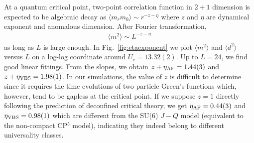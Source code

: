 \documentclass[twocolumn,superscriptaddress]{revtex4-1}
\begin{document}
At a quantum critical point, two-point correlation function in $2+1$ dimension is expected to be algebraic decay as $\langle m_rm_0\rangle\sim r^{-z-\eta}$ where $z$ and $\eta$ are dynamical exponent and anomalous dimension. \cite{Sondhi1997} After Fourier transformation, \begin{eqnarray} \langle m^2 \rangle \sim L^{-z-\eta} \end{eqnarray}
as long as $L$ is large enough. In Fig.~\ref{fig:etaexponent} we plot $\langle m^2 \rangle$ and $\langle d^2\rangle$ versus $L$ on a log-log coordinate around $U_c=13.32(2)$. Up to $L=24$, we find good linear fittings. From the slopes, we obtain $z+\eta_{\rm AF}=1.44(3)$ and $z+\eta_{\rm VBS}=1.98(1)$. In our simulations, the value of $z$ is difficult to determine since it requires the time evolutions of two particle Green's functions which, however, tend to be gapless at the critical point. If we suppose $z=1$ directly following the prediction of deconfined critical theory, \cite{Senthil2004} we get $\eta_{\rm AF}=0.44(3)$ and $\eta_{\rm VBS}=0.98(1)$ which are different from the SU(6) $J-Q$ model (equivalent to the non-compact CP$^5$ model), \cite{Kaul2012a} indicating they indeed belong to different universality classes. 





\end{document}
